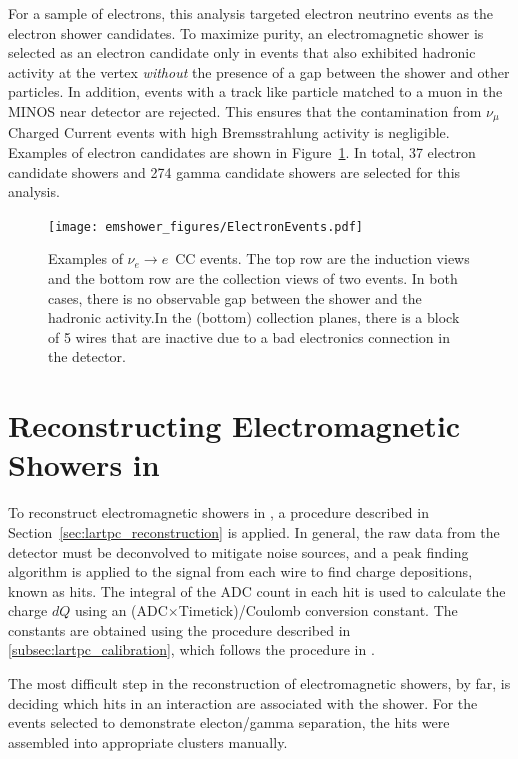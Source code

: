 For a sample of electrons, this analysis targeted electron neutrino events as the electron shower candidates.  To maximize purity, an electromagnetic shower is selected as an electron candidate only in events that also exhibited hadronic activity at the vertex {\em without} the presence of a gap between the shower and other particles.  In addition, events with a track like particle matched to a muon in the MINOS near detector are rejected.  This ensures that the contamination from $\nu_\mu$ Charged Current events with high Bremsstrahlung activity is negligible.  Examples of electron candidates are shown in Figure~\ref{fig:electrons}. In total, 37 electron candidate showers and 274 gamma candidate showers are selected for this analysis.



\begin{figure}[ht]
\centering
\texttt{[image: emshower\_figures/ElectronEvents.pdf]}
\caption[Electron Candidate Events in \argoneut]{\label{fig:electrons} Examples of $\nu_e \rightarrow e$~CC events.  The top row are the induction views and the bottom row are the collection views of two events. In both cases, there is no observable gap between the shower and the hadronic activity.In the (bottom) collection planes, there is a block of 5 wires that are inactive due to a bad electronics connection in the detector.}
\end{figure}


\section{Reconstructing Electromagnetic Showers in \lartpcs}

To reconstruct electromagnetic showers in \lartpcs, a procedure described in Section~\ref{sec:lartpc_reconstruction} is applied.  In general, the raw data from the detector must be deconvolved to mitigate noise sources, and a peak finding algorithm is applied to the signal from each wire to find charge depositions, known as hits. The integral of the ADC count in each hit is used to calculate the charge $dQ$ using an (ADC$\times$Timetick)/Coulomb conversion constant.  The constants are obtained using the procedure described in \ref{subsec:lartpc_calibration}, which follows the procedure in \cite{Anderson:2012mra}.

The most difficult step in the reconstruction of electromagnetic showers, by far, is deciding which hits in an interaction are associated with the shower. For the events selected to demonstrate electon/gamma separation, the hits were assembled into appropriate clusters manually.


